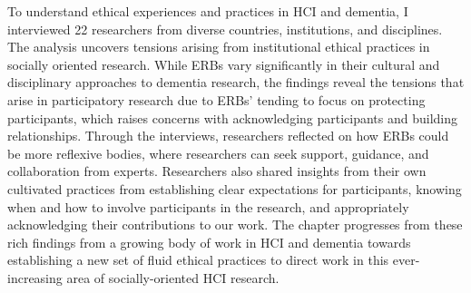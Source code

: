 To understand ethical experiences and practices in HCI and dementia, I interviewed 22 researchers from diverse countries, institutions, and disciplines. The analysis uncovers tensions arising from institutional ethical practices in socially oriented research. While ERBs vary significantly in their cultural and disciplinary approaches to dementia research, the findings reveal the tensions that arise in participatory research due to ERBs’ tending to focus on protecting participants, which raises concerns with acknowledging participants and building relationships. Through the interviews, researchers reflected on how ERBs could be more reflexive bodies, where researchers can seek support, guidance, and collaboration from experts. Researchers also shared insights from their own cultivated practices from establishing clear expectations for participants, knowing when and how to involve participants in the research, and appropriately acknowledging their contributions to our work. The chapter progresses from these rich findings from a growing body of work in HCI and dementia towards establishing a new set of fluid ethical practices to direct work in this ever-increasing area of socially-oriented HCI research. 




